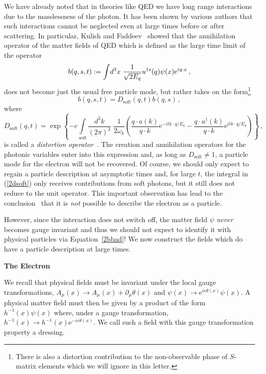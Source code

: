 \documentclass[12pt,a4paper]{article}
\newcommand{\no}{\noindent}
\newcommand{\ad}{{a^{\dag}}}
\newcommand{\cd}{\cdot}
\newcommand{\ecd}{{\cdot}}
\newcommand{\ee}{\mathrm{e}}
\newcommand{\soft}{{\mathrm{soft}}}
\newcommand{\intx}{\int\!d^3x\;}
\newcommand{\intks}{\int\limits_{\soft}\!\frac{d^3k}{(2\pi)^3}\;}
\begin{document}
\no We have already noted that in theories like QED we have long range
interactions due to
the masslessness of the photon. It has been shown by various
authors that such interactions cannot be neglected even at large
times before or after scattering. In particular, Kulish and
Faddeev~\cite{kulish:1970} showed that the annihilation operator
of the matter fields of QED which is defined as the large time
limit of the operator
\begin{equation}\label{2bbad}
  b(q,s, t):=\intx\frac1{\sqrt{2E_{\smash{q}}}}u^{\dag s}(q)\psi(x)\ee^{iq\ecd
  x}\,,
\end{equation}
does not become just the usual free particle mode, but rather takes on
the form\footnote{There is also a distortion contribution to the non-observable
phase of $S$-matrix elements which we will ignore in this letter.}
\begin{equation}\label{2bbadr}
  b(q,s,t)=D_\soft(q,t)b(q,s)\,,
\end{equation}
where
\begin{equation}\label{2dsoft}
  D_{\soft}(q,t)=\exp\left\{-e\!\!\!\intks\frac1{2\omega_k}
  \left(
  \frac{q\cd a(k)}{q\cd k}\ee^{-itk\ecd q/E_q}-
\frac{q\cd \ad(k)}{q\cd k}\ee^{itk\ecd q/E_q}
  \right)\right\}\,,
\end{equation}
is called a \emph{distortion operator}~\cite{kulish:1970}. The
creation and annihilation operators for the photonic variables
enter into this expression and, as long as $D_{\soft}\ne1$, a
particle mode for the electron will not be recovered. Of course,
we should only expect to  regain a particle description at
asymptotic times and, for large $t$, the integral in
(\ref{2dsoft}) only receives contributions from soft photons, but
it still does not reduce to the unit operator. This important
observation has lead to the conclusion~\cite{kulish:1970} that it
is \emph{not} possible to describe the electron as a particle.

However, since the interaction does not switch off, the matter field
$\psi$ \emph{never} becomes gauge invariant and thus we should not expect to
identify it with physical particles via Equation~\ref{2bbad}!
We now construct the fields which do have a particle description at
large times.




\bigskip

\noindent \no \textbf{The Electron}

\smallskip

\no We  recall that physical fields must be invariant under the local gauge
transformations, $A_\mu(x)\to A_\mu(x) + \partial_\mu\theta(x)$ and
$\psi(x)\to \ee^{ie\theta(x)}\psi(x)$. A physical matter field must
then be given by a product of the form $h^{-1}(x)\psi(x)$ where,
under a gauge transformation, $h^{-1}(x)
\to h^{-1}(x) \ee^{-ie\theta(x)}$. We call such a field with this
gauge transformation property a dressing.
\end{document}
